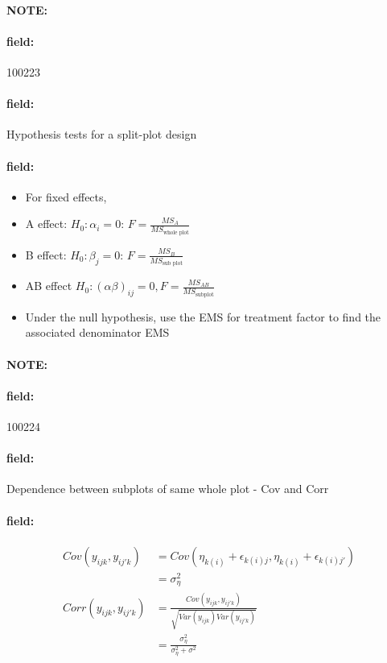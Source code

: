 \documentclass[12pt]{article}
\newenvironment{note}{\paragraph{NOTE:}}{}
\newenvironment{field}{\paragraph{field:}}{}
\begin{document}
\begin{note}
    \begin{field}
        \tiny 100223
    \end{field}
    \begin{field}
        Hypothesis tests for a split-plot design
    \end{field}
    \begin{field}
        \begin{itemize}
          \item For fixed effects,
          \item A effect: $H_0: \alpha_i = 0$: $F = \frac{MS_A}{MS_{\text{whole plot}}}$
          \item B effect: $H_0: \beta_j = 0$: $F = \frac{MS_B}{MS_{\text{sub plot}}}$
          \item AB effect $H_0: (\alpha\beta)_{ij} = 0, F = \frac{MS_{AB}}{MS_{\text{subplot}}}$
          \item Under the null hypothesis, use the EMS for treatment factor to find the associated denominator EMS
        \end{itemize}
    \end{field}
\end{note}

\begin{note}
    \begin{field}
        \tiny 100224
    \end{field}
    \begin{field}
        Dependence between subplots of same whole plot - Cov and Corr
    \end{field}
    \begin{field}
        \begin{align*}
          Cov(y_{ijk},y_{ij'k}) &= Cov(\eta_{k(i)}+ \epsilon_{k(i)j}, \eta_{k(i)} + \epsilon_{k(i)j'})\\
          &= \sigma_\eta^2\\
          Corr(y_{ijk},y_{ij'k}) &= \frac{Cov(y_{ijk},y_{ij'k}) }{\sqrt{Var(y_{ijk})Var(y_{ij'k})}}\\
          &= \frac{\sigma_\eta^2}{\sigma_\eta^2 + \sigma^2}
        \end{align*}
    \end{field}
\end{note}
\end{document}
